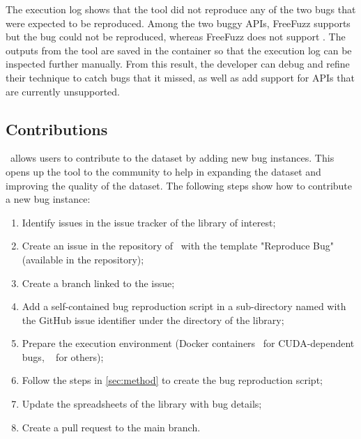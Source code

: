 \documentclass[sigconf,screen]{acmart}
\begin{document}

The execution log shows that the tool did not reproduce any of the
two bugs that were expected to be reproduced. 
Among the two buggy APIs, FreeFuzz supports  but the bug could not be reproduced, whereas FreeFuzz does not support .
The outputs from the tool are saved in the container so that the execution log can be inspected further manually.
From this result, the developer can debug and refine their technique to catch bugs that it missed, as well as add support for APIs that are currently unsupported.

\vspace{-1ex}
\subsection{Contributions}

\tname\ allows users to contribute to the dataset by adding new bug
instances. This opens up the tool to the community to help in
expanding the dataset and improving the quality of the dataset.
The following steps show how to contribute a new bug
instance:

\begin{enumerate}[leftmargin=0.5cm]
  \item Identify issues in the issue tracker of the library of interest;
  \item Create an issue in the repository of \tname\ with the template
    "Reproduce Bug" (available in the repository);
  \item Create a branch linked to the issue;
  \item Add a self-contained bug reproduction script in a sub-directory
    named with the GitHub issue identifier under the directory of the library;
  \item Prepare the execution environment (Docker containers~\cite{merkel2014docker} for CUDA-dependent
    bugs, ~\cite{venv} for others);
  \item Follow the steps in \ref{sec:method} to create the bug reproduction script;
  \item Update the spreadsheets of the library with bug details;
  \item Create a pull request to the main branch.
\end{enumerate}
\end{document}
